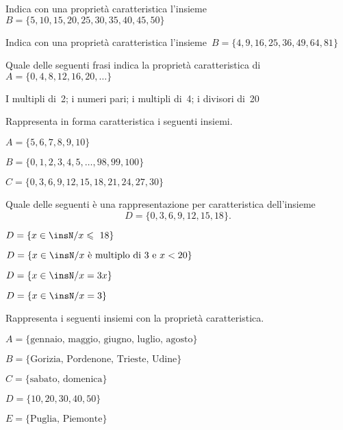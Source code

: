 \begin{esercizio}
\label{ese:6.12}
Indica con una proprietà caratteristica l'insieme~\(B=\{5, 10, 15, 20, 25, 30, 
35, 40, 45, 50\}\)
\end{esercizio}

\begin{esercizio}
\label{ese:6.13}
Indica con una proprietà caratteristica
l'insieme~\(B=\{4, 9, 16, 25, 36, 49, 64, 81\}\)
\end{esercizio}

\begin{esercizio}
\label{ese:6.14}
Quale delle seguenti frasi indica la proprietà caratteristica
di~\(A=\{0, 4, 8, 12, 16, 20, \ldots\}\)
\begin{center}
\boxA\quad I multipli di~2; \quad\boxB\quad i numeri pari; \quad\boxC\quad i 
multipli di~4; \quad\boxD\quad i divisori di~20
\end{center}
\end{esercizio}

\begin{esercizio}
\label{ese:6.15}
Rappresenta in forma caratteristica i seguenti insiemi.
\begin{enumeratea}
\item \(A=\{5, 6, 7, 8, 9, 10\}\)
\item \(B=\{0, 1, 2, 3, 4, 5, \dots, 98, 99, 100\}\)
\item\( C=\{0, 3, 6, 9, 12, 15, 18, 21, 24, 27, 30\}\)
\end{enumeratea}
\end{esercizio}

\begin{esercizio}
\label{ese:6.16}
Quale delle seguenti è una rappresentazione per caratteristica
dell'insieme
\[D = \{0, 3, 6, 9, 12, 15, 18\}.\]
\begin{multicols}{2}
\begin{enumeratea}
\item \(D=\{x\in\insN/x\leqslant~18\}\)
\item \(D=\{x\in\insN/x\text{ è multiplo di~3 e }x<20\}\)%
\item \(D=\{x\in\insN/x=3x\}\)
\item \(D=\{x\in\insN/x=3\}\)
\end{enumeratea}
\end{multicols}
\end{esercizio}

\begin{esercizio}
\label{ese:6.17}
Rappresenta i seguenti insiemi con la proprietà caratteristica.
\begin{enumeratea}
 \item \(A=\{\text{gennaio, maggio, giugno, luglio, agosto}\}\)
 \item \(B=\{\text{Gorizia, Pordenone, Trieste, Udine}\}\)
 \item \(C=\{\text{sabato, domenica}\}\)
 \item \(D=\{10, 20, 30, 40, 50\}\)
 \item \(E=\{\text{Puglia, Piemonte}\}\)
 \end{enumeratea}
\end{esercizio}

